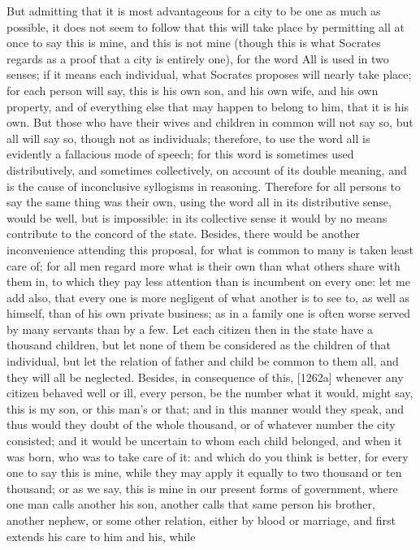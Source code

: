 But admitting that it is most advantageous for a city to be one as much as
possible, it does not seem to follow that this will take place by
permitting all at once to say this is mine, and this is not mine (though
this is what Socrates regards as a proof that a city is entirely one), for
the word All is used in two senses; if it means each individual, what
Socrates proposes will nearly take place; for each person will say, this
is his own son, and his own wife, and his own property, and of everything
else that may happen to belong to him, that it is his own. But those who
have their wives and children in common will not say so, but all will say
so, though not as individuals; therefore, to use the word all is evidently
a fallacious mode of speech; for this word is sometimes used
distributively, and sometimes collectively, on account of its double
meaning, and is the cause of inconclusive syllogisms in reasoning.
Therefore for all persons to say the same thing was their own, using the
word all in its distributive sense, would be well, but is impossible: in
its collective sense it would by no means contribute to the concord of the
state. Besides, there would be another inconvenience attending this
proposal, for what is common to many is taken least care of; for all men
regard more what is their own than what others share with them in, to
which they pay less attention than is incumbent on every one: let me add
also, that every one is more negligent of what another is to see to, as
well as himself, than of his own private business; as in a family one is
often worse served by many servants than by a few. Let each citizen then
in the state have a thousand children, but let none of them be considered
as the children of that individual, but let the relation of father and
child be common to them all, and they will all be neglected. Besides, in
consequence of this, [1262a] whenever any citizen behaved well or ill,
every person, be the number what it would, might say, this is my son, or
this man's or that; and in this manner would they speak, and thus would
they doubt of the whole thousand, or of whatever number the city
consisted; and it would be uncertain to whom each child belonged, and when
it was born, who was to take care of it: and which do you think is better,
for every one to say this is mine, while they may apply it equally to two
thousand or ten thousand; or as we say, this is mine in our present forms
of government, where one man calls another his son, another calls that
same person his brother, another nephew, or some other relation, either by
blood or marriage, and first extends his care to him and his, while
